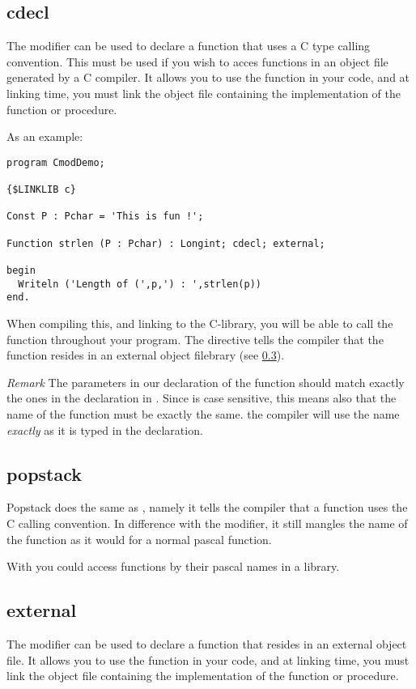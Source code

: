 \documentclass{report}
\begin{document}
\subsection{cdecl}
\label{se:cdecl}
The  modifier can be used to declare a function that uses a C
type calling convention. This must be used if you wish to acces functions in
an object file generated by a C compiler. It allows you to use the function in
your code, and at linking time, you must link the object file containing the
 implementation of the function or procedure.

As an example:
\begin{CodEx}
\begin{verbatim}
program CmodDemo;

{$LINKLIB c}

Const P : Pchar = 'This is fun !';

Function strlen (P : Pchar) : Longint; cdecl; external;

begin
  Writeln ('Length of (',p,') : ',strlen(p))
end.
\end{verbatim}
\end{CodEx}
When compiling this, and linking to the C-library, you will be able to call
the  function throughout your program. The 
directive tells the compiler that the function resides in an external
object filebrary (see \ref{se:external}). 

{\em Remark} The parameters in our declaration of the  function should 
match exactly the ones in the declaration in . Since  is case 
sensitive, this means also that the name of the
function must be exactly the same. the \fpc compiler will use the name {\em
exactly} as it is typed in the declaration.

\subsection{popstack}
\label{se:popstack}
Popstack does the same as , namely it tells the \fpc compiler
that a function uses the C calling convention. In difference with the
 modifier, it still mangles the name of the function as it would 
for a normal pascal function.

With  you could access functions by their pascal names in a
library.

\subsection{external}
\label{se:external}
The  modifier can be used to declare a function that resides in
an external object file. It allows you to use the function in
your code, and at linking time, you must link the object file containing the
implementation of the function or procedure.
\end{document}
